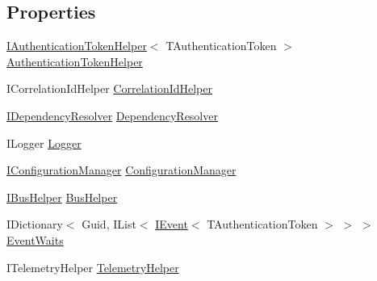 \subsection*{Properties}
\begin{DoxyCompactItemize}
\item 
\hyperlink{interfaceCqrs_1_1Authentication_1_1IAuthenticationTokenHelper}{I\+Authentication\+Token\+Helper}$<$ T\+Authentication\+Token $>$ \hyperlink{classCqrs_1_1Bus_1_1InProcessBus_a20d068b944183ab04e77c3164d19a860}{Authentication\+Token\+Helper}
\item 
I\+Correlation\+Id\+Helper \hyperlink{classCqrs_1_1Bus_1_1InProcessBus_a3ab05953af552331928ca0f1131c269d}{Correlation\+Id\+Helper}
\item 
\hyperlink{interfaceCqrs_1_1Configuration_1_1IDependencyResolver}{I\+Dependency\+Resolver} \hyperlink{classCqrs_1_1Bus_1_1InProcessBus_a2eafea26a2848880fdbf84717b8e60e1}{Dependency\+Resolver}
\item 
I\+Logger \hyperlink{classCqrs_1_1Bus_1_1InProcessBus_a6d20e32f64b6dfce12852083f0c641c8}{Logger}
\item 
\hyperlink{interfaceCqrs_1_1Configuration_1_1IConfigurationManager}{I\+Configuration\+Manager} \hyperlink{classCqrs_1_1Bus_1_1InProcessBus_a403133ecfdbdfa85090366f1d5f95230}{Configuration\+Manager}
\item 
\hyperlink{interfaceCqrs_1_1Bus_1_1IBusHelper}{I\+Bus\+Helper} \hyperlink{classCqrs_1_1Bus_1_1InProcessBus_a5dd1cb40277f3e04e743dd8cd63523ff}{Bus\+Helper}
\item 
I\+Dictionary$<$ Guid, I\+List$<$ \hyperlink{interfaceCqrs_1_1Events_1_1IEvent}{I\+Event}$<$ T\+Authentication\+Token $>$ $>$ $>$ \hyperlink{classCqrs_1_1Bus_1_1InProcessBus_a84de47f021786b0400e0635ec68b4ec1}{Event\+Waits}
\item 
I\+Telemetry\+Helper \hyperlink{classCqrs_1_1Bus_1_1InProcessBus_aeb193bb8b08276db30dd376696726893}{Telemetry\+Helper}
\end{DoxyCompactItemize}


